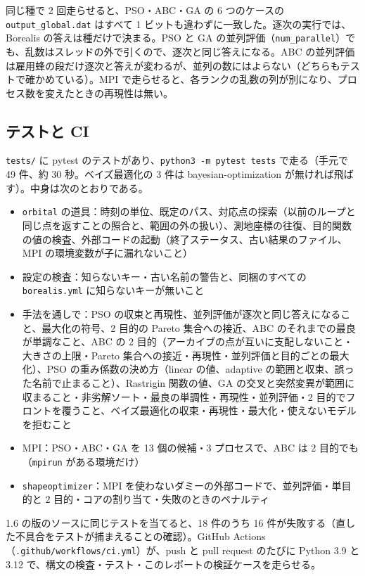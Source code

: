 \documentclass[11pt,a4paper,dvipdfmx]{jsarticle}
\begin{document}
同じ種で 2 回走らせると、PSO・ABC・GA の 6 つのケースの \texttt{output\_global.dat} はすべて 1 ビットも違わずに一致した。逐次の実行では、Borealis の答えは種だけで決まる。PSO と GA の並列評価（\texttt{num\_parallel}）でも、乱数はスレッドの外で引くので、逐次と同じ答えになる。ABC の並列評価は雇用蜂の段だけ逐次と答えが変わるが、並列の数にはよらない（どちらもテストで確かめている）。MPI で走らせると、各ランクの乱数の列が別になり、プロセス数を変えたときの再現性は無い。

\subsection{テストと CI}\label{sec:tests}

\texttt{tests/} に pytest のテストがあり、\texttt{python3 -m pytest tests} で走る（手元で 49 件、約 30 秒。ベイズ最適化の 3 件は bayesian-optimization が無ければ飛ばす）。中身は次のとおりである。

\begin{itemize}
\item \texttt{orbital} の道具：時刻の単位、既定のパス、対応点の探索（以前のループと同じ点を返すことの照合と、範囲の外の扱い）、測地座標の往復、目的関数の値の検査、外部コードの起動（終了ステータス、古い結果のファイル、MPI の環境変数が子に漏れないこと）
\item 設定の検査：知らないキー・古い名前の警告と、同梱のすべての \texttt{borealis.yml} に知らないキーが無いこと
\item 手法を通しで：PSO の収束と再現性、並列評価が逐次と同じ答えになること、最大化の符号、2 目的の Pareto 集合への接近、ABC のそれまでの最良が単調なこと、ABC の 2 目的（アーカイブの点が互いに支配しないこと・大きさの上限・Pareto 集合への接近・再現性・並列評価と目的ごとの最大化）、PSO の重み係数の決め方（linear の値、adaptive の範囲と収束、誤った名前で止まること）、Rastrigin 関数の値、GA の交叉と突然変異が範囲に収まること・非劣解ソート・最良の単調性・再現性・並列評価・2 目的でフロントを覆うこと、ベイズ最適化の収束・再現性・最大化・使えないモデルを拒むこと
\item MPI：PSO・ABC・GA を 13 個の候補・3 プロセスで、ABC は 2 目的でも（\texttt{mpirun} がある環境だけ）
\item \texttt{shapeoptimizer}：MPI を使わないダミーの外部コードで、並列評価・単目的と 2 目的・コアの割り当て・失敗のときのペナルティ
\end{itemize}

1.6 の版のソースに同じテストを当てると、18 件のうち 16 件が失敗する（直した不具合をテストが捕まえることの確認）。GitHub Actions（\texttt{.github/workflows/ci.yml}）が、push と pull request のたびに Python 3.9 と 3.12 で、構文の検査・テスト・このレポートの検証ケースを走らせる。
\end{document}
